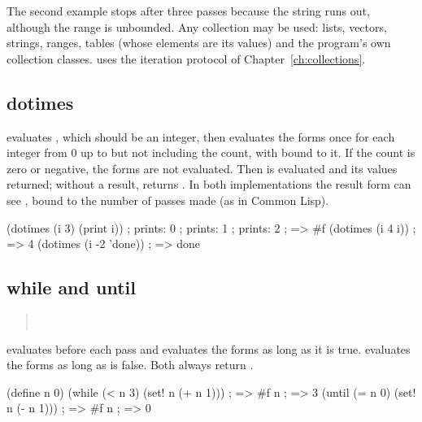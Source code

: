 \noindent The second example stops after three passes because the string
runs out, although the range  is unbounded. Any
collection may be used: lists, vectors, strings, ranges, tables
(whose elements are its values) and the program's own collection classes.
 uses the iteration protocol of Chapter~\ref{ch:collections}.

\subsection{dotimes}

\begin{quote}
\end{quote}

\noindent {} evaluates , which should be an
integer, then evaluates the forms once for each integer from 0 up to but not
including the count, with  bound to it. If the count is zero or
negative, the forms are not evaluated. Then  is evaluated and
its values returned; without a result,  returns .
In both implementations the result form can see , bound to the
number of passes made (as in Common Lisp).

\begin{dylan}
(dotimes (i 3)
  (print i))             ; prints: 0
                         ; prints: 1
                         ; prints: 2
                         ; => #f
(dotimes (i 4 i))        ; => 4
(dotimes (i -2 'done))   ; => done
\end{dylan}

\subsection{while and until}

\begin{quote}
\\
\end{quote}

\noindent {} evaluates  before each pass and evaluates
the forms as long as it is true.  evaluates the forms as long as
 is false. Both always return .

\begin{dylan}
(define n 0)
(while (< n 3)
  (set! n (+ n 1)))      ; => #f
n                        ; => 3
(until (= n 0)
  (set! n (- n 1)))      ; => #f
n                        ; => 0
\end{dylan}

